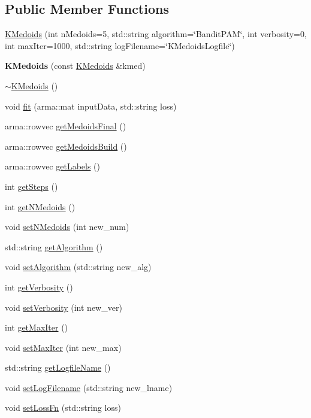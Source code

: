 \subsection*{Public Member Functions}
\begin{DoxyCompactItemize}
\item 
\hyperlink{classKMedoids_aef6c94fdc427f213dfeb719d711db6cf}{K\+Medoids} (int n\+Medoids=5, std\+::string algorithm=\char`\"{}Bandit\+P\+AM\char`\"{}, int verbosity=0, int max\+Iter=1000, std\+::string log\+Filename=\char`\"{}K\+Medoids\+Logfile\char`\"{})
\item 
\mbox{\label{classKMedoids_a3d05d453ee8c395102ac9d20c91a9a12}} 
{\bfseries K\+Medoids} (const \hyperlink{classKMedoids}{K\+Medoids} \&kmed)
\item 
\hyperlink{classKMedoids_a82710100b6fb5820c10bc3f796ed62ff}{$\sim$\+K\+Medoids} ()
\item 
void \hyperlink{classKMedoids_ae241800e72a6b4a677333ffbf06e1798}{fit} (arma\+::mat input\+Data, std\+::string loss)
\item 
arma\+::rowvec \hyperlink{classKMedoids_a26aa9827d2541626d959dc984f0f9bcb}{get\+Medoids\+Final} ()
\item 
arma\+::rowvec \hyperlink{classKMedoids_a54370d8d0f5c500f5deb859a9eab891c}{get\+Medoids\+Build} ()
\item 
arma\+::rowvec \hyperlink{classKMedoids_a89474787892880381e4d0282de541d03}{get\+Labels} ()
\item 
int \hyperlink{classKMedoids_a2c8d55468ebe909229ea7bcdb50e8351}{get\+Steps} ()
\item 
int \hyperlink{classKMedoids_ad738dc6b5a2dafa1ff4aeab807d6407d}{get\+N\+Medoids} ()
\item 
void \hyperlink{classKMedoids_ad28860f50c0b5a4968f99d103b3de06f}{set\+N\+Medoids} (int new\+\_\+num)
\item 
std\+::string \hyperlink{classKMedoids_a01a1bf63fdd2cd8b389c3f1c0619388f}{get\+Algorithm} ()
\item 
void \hyperlink{classKMedoids_a1a6dbc45f5d83bded48bf86cbc2690ad}{set\+Algorithm} (std\+::string new\+\_\+alg)
\item 
int \hyperlink{classKMedoids_a8d5372adbed828602f9311dbe9c70198}{get\+Verbosity} ()
\item 
void \hyperlink{classKMedoids_a8d03726bbd66ffc6d2c202d2a3cf40d5}{set\+Verbosity} (int new\+\_\+ver)
\item 
int \hyperlink{classKMedoids_ac0569206113015abb38954f78a194eb5}{get\+Max\+Iter} ()
\item 
void \hyperlink{classKMedoids_ae1a84d5509090d31cd1c04616fd615f3}{set\+Max\+Iter} (int new\+\_\+max)
\item 
std\+::string \hyperlink{classKMedoids_ad5982ef2a71cce9f1f45b98c55350391}{get\+Logfile\+Name} ()
\item 
void \hyperlink{classKMedoids_a45f89770245bff638e25bcd39ab52013}{set\+Log\+Filename} (std\+::string new\+\_\+lname)
\item 
void \hyperlink{classKMedoids_ab442bf7198be7a48a7eb5901ac7ca571}{set\+Loss\+Fn} (std\+::string loss)
\end{DoxyCompactItemize}


